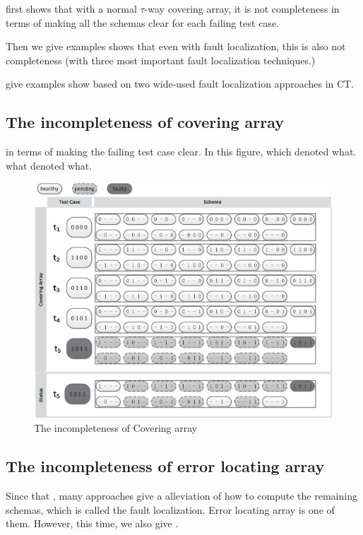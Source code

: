 first shows that with a normal $\tau$-way covering array, it is not completeness in terms of making  all the schemas clear for each failing test case.

Then we give examples shows that even with fault localization, this is also not completeness (with three most important fault localization techniques.)

give examples show based on two wide-used fault localization approaches in CT.

\subsection{The incompleteness of covering array}

in terms of making the failing test case clear. In this figure, which denoted what. what denoted what.


\begin{figure}[ht]
 \centering
 \includegraphics[width=5.6in]{ca.eps}
 \caption{The incompleteness of Covering array }
 \label{fig_inc_ca}
\end{figure}




\subsection{The incompleteness of error locating array}
Since that , many approaches give a alleviation of how to compute the remaining schemas, which is called the fault localization. Error locating array is one of them. However, this time, we also give .

